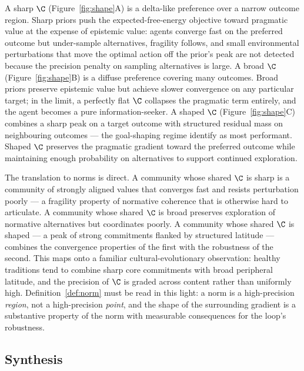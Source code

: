 A sharp $\C$ (Figure~\ref{fig:shape}A) is a delta-like preference over a
narrow outcome region. Sharp priors push the expected-free-energy objective
toward pragmatic value at the expense of epistemic value: agents converge
fast on the preferred outcome but under-sample alternatives, fragility
follows, and small environmental perturbations that move the optimal action
off the prior's peak are not detected because the precision penalty on
sampling alternatives is large. A broad $\C$ (Figure~\ref{fig:shape}B) is a
diffuse preference covering many outcomes. Broad priors preserve epistemic
value but achieve slower convergence on any particular target; in the limit,
a perfectly flat $\C$ collapses the pragmatic term entirely, and the agent
becomes a pure information-seeker. A shaped $\C$ (Figure~\ref{fig:shape}C)
combines a sharp peak on a target outcome with structured residual mass on
neighbouring outcomes --- the goal-shaping regime
\citet{torresan2025ShapeC} identify as most performant. Shaped $\C$
preserves the pragmatic gradient toward the preferred outcome while
maintaining enough probability on alternatives to support continued
exploration.

The translation to norms is direct. A community whose shared $\C$ is sharp
is a community of strongly aligned values that converges fast and resists
perturbation poorly --- a fragility property of normative coherence that is
otherwise hard to articulate. A community whose shared $\C$ is broad
preserves exploration of normative alternatives but coordinates poorly. A
community whose shared $\C$ is shaped --- a peak of strong commitments
flanked by structured latitude --- combines the convergence properties of
the first with the robustness of the second. This maps onto a familiar
cultural-evolutionary observation: healthy traditions tend to combine sharp
core commitments with broad peripheral latitude, and the precision of $\C$
is graded across content rather than uniformly high. Definition~\ref{def:norm}
must be read in this light: a norm is a high-precision \emph{region}, not a
high-precision \emph{point}, and the shape of the surrounding gradient is a
substantive property of the norm with measurable consequences for the
loop's robustness.

\subsection{Synthesis}
\label{sec:formal-synthesis}

